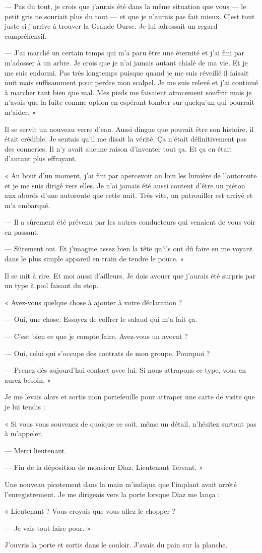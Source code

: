 — Pas du tout, je crois que j'aurais été dans la même situation que vous — le petit gris ne souriait plus du tout — et
que je n'aurais pas fait mieux. C'est tout juste si j'arrive à trouver la Grande Ourse. Je lui adressait un regard
compréhensif.

— J'ai marché un certain temps qui m'a paru être une éternité et j'ai fini par m'adosser à un arbre. Je crois que je
n'ai jamais autant chialé de ma vie. Et je me suis endormi. Pas très longtemps puisque quand je me suis réveillé il
faisait nuit mais suffisamment pour perdre mon scalpel. Je me suis relevé et j'ai continué à marcher tant bien que mal.
Mes pieds me faisaient atrocement souffrir mais je n'avais que la fuite comme option en espérant tomber sur quelqu'un
qui pourrait m'aider. »

Il se servit un nouveau verre d'eau. Aussi dingue que pouvait être son histoire, il était crédible. Je sentais qu'il me
disait la vérité. Ça n'était définitivement pas des conneries. Il n'y avait aucune raison d'inventer tout ça. Et ça en
était d'autant plus effrayant.

« Au bout d'un moment, j'ai fini par apercevoir au loin les lumière de l'autoroute et je me suis dirigé vers elles. Je
n'ai jamais été aussi content d'être un piéton aux abords d'une autoroute que cette nuit. Très vite, un patrouiller
est arrivé et m'a embarqué.

— Il a sûrement été prévenu par les autres conducteurs qui venaient de vous voir en passant.

— Sûrement oui. Et j'imagine assez bien la tête qu'ils ont dû faire en me voyant dans le plus simple appareil en train
de tendre le pouce. »

Il se mit à rire. Et moi aussi d'ailleurs. Je dois avouer que j'aurais été surpris par un type à poil faisant du stop.

« Avez-vous quelque chose à ajouter à votre déclaration ?

— Oui, une chose. Essayez de coffrer le salaud qui m'a fait ça.

— C'est bien ce que je compte faire. Avez-vous un avocat ?

— Oui, celui qui s'occupe des contrats de mon groupe. Pourquoi ?

— Prenez dès aujourd'hui contact avec lui. Si nous attrapons ce type, vous en aurez besoin. »

Je me levais alors et sortis mon portefeuille pour attraper une carte de visite que je lui tendis :

« Si vous vous souvenez de quoique ce soit, même un détail, n'hésitez surtout pas à m'appeler.

— Merci lieutenant.

— Fin de la déposition de monsieur Diaz. Lieutenant Tersant. »

Une nouveau picotement dans la main m'indiqua que l'implant avait arrêté l'enregistrement. Je me dirigeais vers la
porte lorsque Diaz me lança :

« Lieutenant ? Vous croyais que vous allez le chopper ?

— Je vais tout faire pour. »

J'ouvris la porte et sortis dans le couloir. J'avais du pain sur la planche.